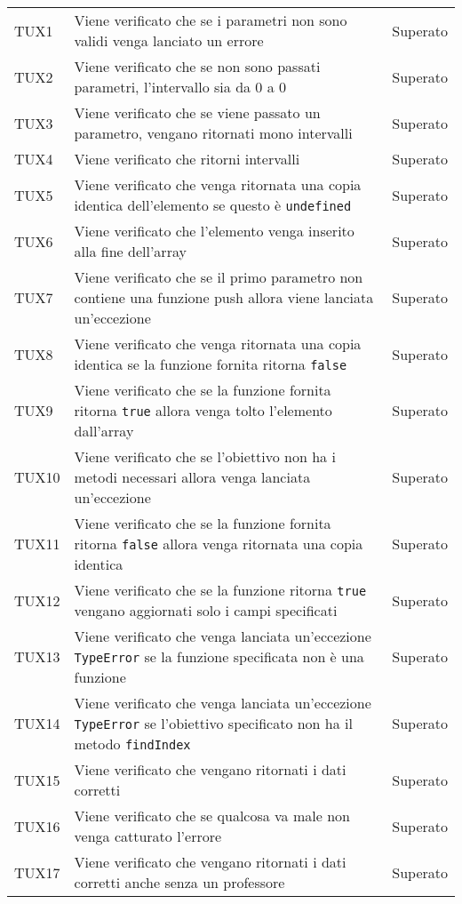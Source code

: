 \documentclass[PianoDiQualifica.tex]{subfiles}
\begin{document}
\begin{longtable}[H]{P{2cm}P{8.5cm}P{3cm}}
	\hhline{===}
	TUX1 & Viene verificato che se i parametri non sono validi venga lanciato un errore & Superato \\
	TUX2 & Viene verificato che se non sono passati parametri, l'intervallo sia da 0 a 0 & Superato \\
	TUX3 & Viene verificato che se viene passato un parametro, vengano ritornati mono intervalli  & Superato \\
	TUX4 & Viene verificato che ritorni intervalli & Superato \\
	TUX5 & Viene verificato che venga ritornata una copia identica dell'elemento se questo è \texttt{undefined} & Superato \\
	TUX6 & Viene verificato che l'elemento venga inserito alla fine dell'array & Superato \\
	TUX7 & Viene verificato che se il primo parametro non contiene una funzione push allora viene lanciata un'eccezione & Superato \\
	TUX8 & Viene verificato che venga ritornata una copia identica se la funzione fornita ritorna \texttt{false} & Superato \\
	TUX9 & Viene verificato che se la funzione fornita ritorna \texttt{true} allora venga tolto l'elemento dall'array & Superato \\
	TUX10 & Viene verificato che se l'obiettivo non ha i metodi necessari allora venga lanciata un'eccezione & Superato \\
	TUX11 & Viene verificato che se la funzione fornita ritorna \texttt{false} allora venga ritornata una copia identica & Superato \\
	TUX12 & Viene verificato che se la funzione ritorna \texttt{true} vengano aggiornati solo i campi specificati & Superato \\
	TUX13 & Viene verificato che venga lanciata un'eccezione \texttt{TypeError} se la funzione specificata non è una funzione & Superato \\
	TUX14 & Viene verificato che venga lanciata un'eccezione \texttt{TypeError} se l'obiettivo specificato non ha il metodo \texttt{findIndex} & Superato \\
	TUX15 & Viene verificato che vengano ritornati i dati corretti & Superato \\
	TUX16 & Viene verificato che se qualcosa va male non venga catturato l'errore & Superato \\
	TUX17 & Viene verificato che vengano ritornati i dati corretti anche senza un professore & Superato \\

\end{longtable}
\end{document}
